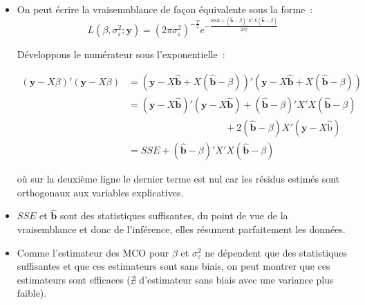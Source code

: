 \documentclass[10pt]{beamer}
\theoremstyle{plain}
\begin{document}
\begin{notes}

  \begin{itemize}

  \item On peut écrire la vraisemnblance de façon équivalente sous la forme~:
    \[
      L(\beta, \sigma_{\varepsilon}^2; \mathbf y) = (2\pi\sigma_{\varepsilon}^2)^{-\frac{T}{2}}e^{-\frac{SSE + \left(\hat{\mathbf b}-\beta\right)'X'X\left(\hat{\mathbf b}-\beta\right)}{2\sigma_{\varepsilon}^2}}
    \]

    \medskip

    Développons le numérateur sous l'exponentielle~:

    \begin{align*}
      (\mathbf y - X\beta)'(\mathbf y - X\beta) &= \left(\mathbf y - X\hat{\mathbf b} + X(\hat{\mathbf b}-\beta)\right)'\left(\mathbf y - X\hat{\mathbf b} + X(\hat{\mathbf b}-\beta)\right)\\
                                                &= (\mathbf y - X\hat{\mathbf b})'(\mathbf y - X\hat{\mathbf b})
                                                     + (\hat{\mathbf b}-\beta)'X'X(\hat{\mathbf b}-\beta)\\
                                                & \quad\quad\quad\quad\quad\quad\quad\quad\quad\quad   + 2(\hat{\mathbf b}-\beta)X'(\mathbf y-X\hat{\mathrm b})\\
                                                   &= SSE + (\hat{\mathbf b}-\beta)'X'X(\hat{\mathbf b}-\beta)
      \end{align*}

    où sur la deuxième ligne le dernier terme est nul car les résidus estimés sont orthogonaux aux variables explicatives.\newline


  \item $SSE$ et $\hat{\mathbf b}$ sont des statistiques suffisantes, du point de vue de la vraisemblance et donc de l'inférence, elles résument parfaitement les données.\newline

  \item Comme l'estimateur des MCO pour $\beta$
    et $\sigma_{\varepsilon}^2$ ne dépendent que des statistiques
    suffisantes et que ces estimateurs sont sans biais, on peut
    montrer que ces estimateurs sont efficaces ($\nexists$
    d'estimateur sans biais avec une variance plus faible).

  \end{itemize}

\end{notes}
\end{document}
